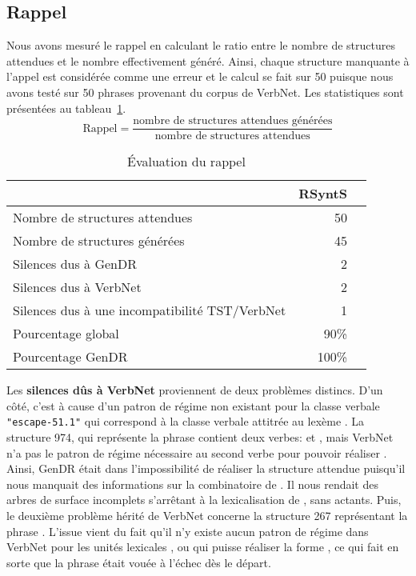 \subsection{Rappel}
Nous avons mesuré le rappel en calculant le ratio entre le nombre de structures attendues et le nombre effectivement généré. Ainsi, chaque structure manquante à l'appel est considérée comme une erreur et le calcul se fait sur 50 puisque nous avons testé sur 50 phrases provenant du corpus de VerbNet. Les statistiques sont présentées au tableau~\ref{fig:evaluationrappel}.
\[\text{Rappel} = \frac{\text{nombre de structures attendues générées}}{\text{nombre de structures attendues}}\]

\begin{table}
\caption{Évaluation du rappel}
\label{fig:evaluationrappel}
\begin{tabular}{lrr}
 \toprule
   & RSyntS\\
 \midrule
 Nombre de structures attendues   & 50\\
 Nombre de structures générées &  45\\
 Silences dus à GenDR & 2\\
 Silences dus à VerbNet    & 2\\
 Silences dus à une incompatibilité TST/VerbNet & 1\\
 \midrule
Pourcentage global & 90\% \\
Pourcentage GenDR & 100\% \\
\bottomrule
\end{tabular}
\end{table}

Les \textbf{silences dûs à VerbNet} proviennent de deux problèmes distincs. D'un côté, c'est à cause d'un patron de régime non existant pour la classe verbale \texttt{"escape-51.1"} qui correspond à la classe verbale attitrée au lexème . La structure 974, qui représente la phrase  contient deux verbes:  et , mais VerbNet n'a pas le patron de régime nécessaire au second verbe pour pouvoir réaliser . Ainsi, GenDR était dans l'impossibilité de réaliser la structure attendue puisqu'il nous manquait des informations sur la combinatoire de . Il nous rendait des arbres de surface incomplets s'arrêtant à la lexicalisation de , sans actants. Puis, le deuxième problème hérité de VerbNet concerne la structure 267 représentant la phrase . L'issue vient du fait qu'il n'y existe aucun patron de régime dans VerbNet pour les unités lexicales ,  ou  qui puisse réaliser la forme , ce qui fait en sorte que la phrase était vouée à l'échec dès le départ.

